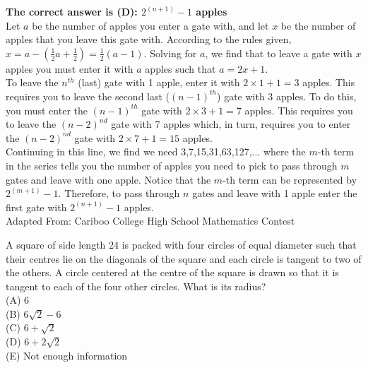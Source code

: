 \documentclass{article}
\begin{document}
\textbf{The correct answer is (D): $2^{(n+1)}-1$ apples}\\[1 ex]
Let $a$ be the number of apples you enter a gate with, and let $x$ be the number of apples that you leave this gate with. According to the rules given, $x=a-(\frac{1}{2}a+\frac{1}{2})=\frac{1}{2}(a-1)$. Solving for $a$, we find that to leave a gate with $x$ apples you must enter it with $a$ apples such that $a=2x+1$.\\
To leave the $n^{th}$ (last) gate with 1 apple, enter it with $2\times1+1=3$ apples.  This requires you to leave the second last ($(n-1)^{th}$) gate with 3 apples.  To do this, you must enter the $(n-1)^{th}$ gate with $2\times3+1=7$ apples.  This requires you to leave the $(n-2)^{nd}$ gate with 7 apples which, in turn, requires you to enter the $(n-2)^{nd}$ gate with $2\times7+1=15$ apples.\\
Continuing in this line, we find we need 3,7,15,31,63,127,... where the $m$-th term in the series tells you the number of apples you need to pick to pass through $m$ gates and leave with one apple.  Notice that the $m$-th term can be represented by $2^{(m+1)}-1$. Therefore, to pass through $n$ gates and leave with 1 apple enter the first gate with $2^{(n+1)}-1$ apples.
\\[5 ex]

\scriptsize
Adapted From: Cariboo College High School Mathematics Contest

\normalsize
A square of side length 24 is packed with four circles of equal diameter such that their centres lie on the diagonals of the square and each circle is tangent to two of the others. A circle centered at the centre of the square is drawn so that it is tangent to each of the four other circles. What is its radius?\\
(A) 6\\
(B) $6\sqrt{2}-6$\\
(C) $6+\sqrt{2}$\\
(D) $6+2\sqrt{2}$\\
(E) Not enough information\\
\end{document}
